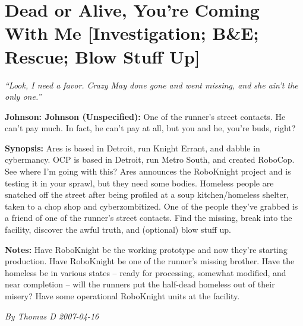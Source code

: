 \documentclass[letterpaper,twocolumn,10.5pt]{article}
\newenvironment{scenario}[6]
	{
		\section{#1 {\small[#2]}}
		\textit{#3}
		\def\TMPSCENARIO{#4 #5}
	}
	{\small\textit{By \TMPSCENARIO}}
\newcommand{\johnson}[2]{\textbf{Johnson: #1 (#2):}}
\newcommand{\synopsis}{\textbf{Synopsis: }}
\newcommand{\notes}{\textbf{Notes: }}
\begin{document}
\begin{scenario}{Dead or Alive, You're Coming With Me}
	{Investigation; B\&E; Rescue; Blow Stuff Up}
	{``Look, I need a favor. Crazy May done gone and went missing, and she ain't the only one.''}
	{Thomas D}
	{2007-04-16}
	{https://forum.rpg.net/showthread.php?321504-Shadowrun-4th-101-Instant-Scenarios\&p=7176239#post7176239}

\johnson{Johnson}{Unspecified} One of the runner's street contacts. He can't pay much. In fact, he can't pay at all, but you and he, you're buds, right?

\synopsis Ares is based in Detroit, run Knight Errant, and dabble in cybermancy. OCP is based in Detroit, run Metro South, and created RoboCop. See where I'm going with this? Ares announces the RoboKnight project and is testing it in your sprawl, but they need some bodies. Homeless people are snatched off the street after being profiled at a soup kitchen/homeless shelter, taken to a chop shop and cyberzombitized. One of the people they've grabbed is a friend of one of the runner's street contacts. Find the missing, break into the facility, discover the awful truth, and (optional) blow stuff up.

\notes Have RoboKnight be the working prototype and now they're starting production. Have RoboKnight be one of the runner's missing brother. Have the homeless be in various states -- ready for processing, somewhat modified, and near completion -- will the runners put the half-dead homeless out of their misery? Have some operational RoboKnight units at the facility. 

\end{scenario}
\end{document}
